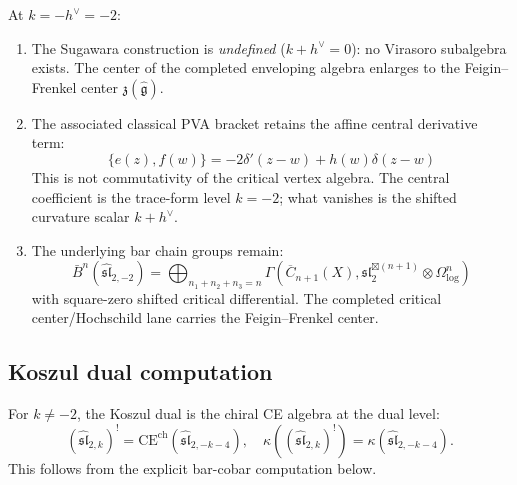 \begin{theorem}\label{thm:sl2-critical}
At $k = -h^\vee = -2$:
\begin{enumerate}
\item The Sugawara construction is \emph{undefined} ($k + h^\vee = 0$): no Virasoro subalgebra exists. The center of the completed enveloping algebra enlarges to the Feigin--Frenkel center $\mathfrak{z}(\widehat{\mathfrak{g}})$.
\item The associated classical PVA bracket retains the affine
central derivative term:
\begin{equation}
\{e(z), f(w)\} = -2\delta'(z-w) + h(w)\delta(z-w)
\end{equation}
This is not commutativity of the critical vertex algebra. The
central coefficient is the trace-form level $k=-2$; what vanishes is
the shifted curvature scalar $k+h^\vee$.
\item The underlying bar chain groups remain:
\begin{equation}
\bar{B}^n(\widehat{\mathfrak{sl}}_{2,-2}) = \bigoplus_{n_1+n_2+n_3=n} \Gamma(\overline{C}_{n+1}(X), \mathfrak{sl}_2^{\boxtimes(n+1)} \otimes \Omega^n_{\log})
\end{equation}
with square-zero shifted critical differential. The completed critical
center/Hochschild lane carries the Feigin--Frenkel center.
\end{enumerate}
\end{theorem}

\subsection{Koszul dual computation}

\begin{theorem}\label{thm:sl2-koszul-dual}
For $k \neq -2$, the Koszul dual is the chiral CE algebra at the dual level:
\begin{equation}
(\widehat{\mathfrak{sl}}_{2,k})^! = \mathrm{CE}^{\mathrm{ch}}(\widehat{\mathfrak{sl}}_{2,-k-4}),
\quad \kappa((\widehat{\mathfrak{sl}}_{2,k})^!) = \kappa(\widehat{\mathfrak{sl}}_{2,-k-4}).
\end{equation}
This follows from the explicit bar-cobar computation below.
\end{theorem}

